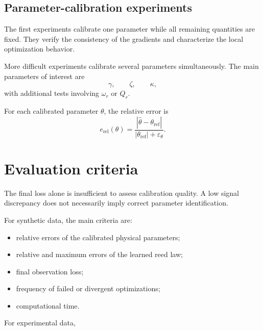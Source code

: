 \documentclass[11pt,a4paper]{report}
\theoremstyle{plain}
\theoremstyle{definition}
\begin{document}
\subsection{Parameter-calibration experiments}

The first experiments calibrate one parameter while all remaining quantities
are fixed. They verify the consistency of the gradients and characterize the
local optimization behavior.

More difficult experiments calibrate several parameters simultaneously. The
main parameters of interest are
\begin{equation}
\gamma,\qquad
\zeta,\qquad
\kappa,
\end{equation}
with additional tests involving \(\omega_r\) or \(Q_r\).

For each calibrated parameter \(\theta\), the relative error is
\begin{equation}
e_{\mathrm{rel}}(\theta)
=
\frac{
|\widehat{\theta}-\theta_{\mathrm{ref}}|
}{
|\theta_{\mathrm{ref}}|+\varepsilon_\theta
}.
\label{eq:relative_parameter_error}
\end{equation}



\section{Evaluation criteria}
\label{sec:evaluation_criteria}

The final loss alone is insufficient to assess calibration quality. A low signal
discrepancy does not necessarily imply correct parameter identification.

For synthetic data, the main criteria are:
\begin{itemize}
    \item relative errors of the calibrated physical parameters;
    \item relative and maximum errors of the learned reed law;
    \item final observation loss;
    \item frequency of failed or divergent optimizations;
    \item computational time.
\end{itemize}

For experimental data, 

\end{document}
